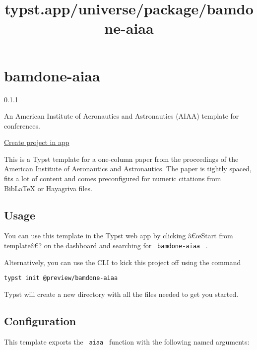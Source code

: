 \title{typst.app/universe/package/bamdone-aiaa}

\label{banner}
\label{template-thumbnail}

\section{bamdone-aiaa}\label{bamdone-aiaa}

{ 0.1.1 }

An American Institute of Aeronautics and Astronautics (AIAA) template
for conferences.

\href{/app?template=bamdone-aiaa&version=0.1.1}{Create project in app}

\label{readme}
This is a Typst template for a one-column paper from the proceedings of
the American Institute of Aeronautics and Astronautics. The paper is
tightly spaced, fits a lot of content and comes preconfigured for
numeric citations from BibLaTeX or Hayagriva files.

\subsection{Usage}\label{usage}

You can use this template in the Typst web app by clicking â€œStart from
templateâ€? on the dashboard and searching for \texttt{\ bamdone-aiaa\ }
.

Alternatively, you can use the CLI to kick this project off using the
command

\begin{verbatim}
typst init @preview/bamdone-aiaa
\end{verbatim}

Typst will create a new directory with all the files needed to get you
started.

\subsection{Configuration}\label{configuration}

This template exports the \texttt{\ aiaa\ } function with the following
named arguments:

